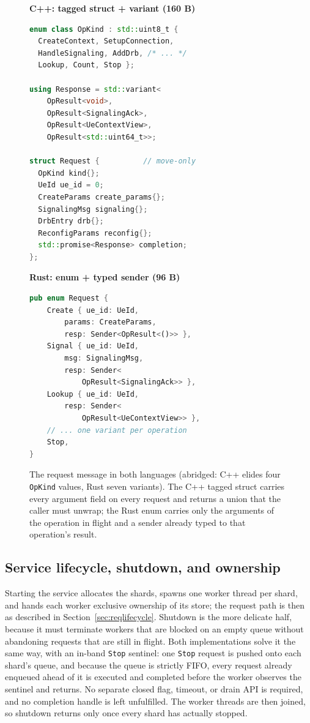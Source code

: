 \documentclass[english,twoside,openright,a4paper,censored,csm,software-track-2020]{HYthesisML}
\begin{document}
\begin{figure}
\begin{minipage}[t]{0.50\linewidth}
\textbf{\footnotesize C++: tagged struct + variant (160 B)}
\begin{lstlisting}[language=C++]
enum class OpKind : std::uint8_t {
  CreateContext, SetupConnection,
  HandleSignaling, AddDrb, /* ... */
  Lookup, Count, Stop };

using Response = std::variant<
    OpResult<void>,
    OpResult<SignalingAck>,
    OpResult<UeContextView>,
    OpResult<std::uint64_t>>;

struct Request {          // move-only
  OpKind kind{};
  UeId ue_id = 0;
  CreateParams create_params{};
  SignalingMsg signaling{};
  DrbEntry drb{};
  ReconfigParams reconfig{};
  std::promise<Response> completion;
};
\end{lstlisting}
\end{minipage}\hfill
\begin{minipage}[t]{0.46\linewidth}
\textbf{\footnotesize Rust: enum + typed sender (96 B)}
\begin{lstlisting}[language=Rust]
pub enum Request {
    Create { ue_id: UeId,
        params: CreateParams,
        resp: Sender<OpResult<()>> },
    Signal { ue_id: UeId,
        msg: SignalingMsg,
        resp: Sender<
            OpResult<SignalingAck>> },
    Lookup { ue_id: UeId,
        resp: Sender<
            OpResult<UeContextView>> },
    // ... one variant per operation
    Stop,
}
\end{lstlisting}
\end{minipage}
\caption{The request message in both languages (abridged: C++ elides four \texttt{OpKind}
values, Rust seven variants). The C++ tagged struct carries every argument field on every
request and returns a union that the caller must unwrap; the Rust enum carries only the
arguments of the operation in flight and a sender already typed to that operation's
result.\label{lst:request}}
\end{figure}

\subsection{Service lifecycle, shutdown, and ownership}
Starting the service allocates the shards, spawns one worker thread per shard, and hands each
worker exclusive ownership of its store; the request path is then as described in
Section~\ref{sec:reqlifecycle}. Shutdown is the more delicate half, because it must terminate
workers that are blocked on an empty queue without abandoning requests that are still in
flight. Both implementations solve it the same way, with an in-band \texttt{Stop} sentinel:
one \texttt{Stop} request is pushed onto each shard's queue, and because the queue is strictly
FIFO, every request already enqueued ahead of it is executed and completed before the worker
observes the sentinel and returns. No separate closed flag, timeout, or drain API is required,
and no completion handle is left unfulfilled. The worker threads are then joined, so shutdown
returns only once every shard has actually stopped.
\end{document}
